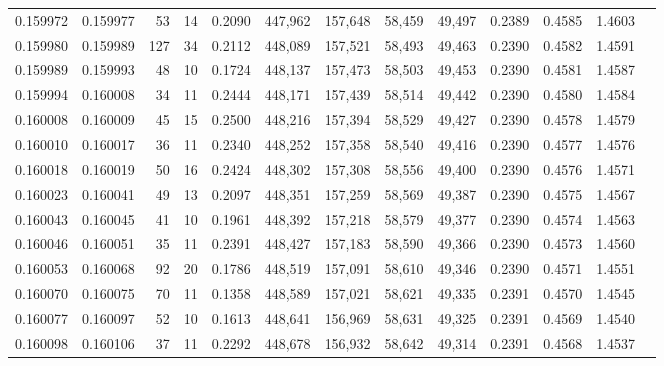 \begin{tabular}{rrrrrrrrrrrrr}
0.159972 & 0.159977 &    53 &  14 &                                     0.2090 & 447,962 & 157,648 &  58,459 &  49,497 & 0.2389 & 0.4585 & 1.4603 \\
0.159980 & 0.159989 &   127 &  34 &                                     0.2112 & 448,089 & 157,521 &  58,493 &  49,463 & 0.2390 & 0.4582 & 1.4591 \\
0.159989 & 0.159993 &    48 &  10 &                                     0.1724 & 448,137 & 157,473 &  58,503 &  49,453 & 0.2390 & 0.4581 & 1.4587 \\
0.159994 & 0.160008 &    34 &  11 &                                     0.2444 & 448,171 & 157,439 &  58,514 &  49,442 & 0.2390 & 0.4580 & 1.4584 \\
0.160008 & 0.160009 &    45 &  15 &                                     0.2500 & 448,216 & 157,394 &  58,529 &  49,427 & 0.2390 & 0.4578 & 1.4579 \\
0.160010 & 0.160017 &    36 &  11 &                                     0.2340 & 448,252 & 157,358 &  58,540 &  49,416 & 0.2390 & 0.4577 & 1.4576 \\
0.160018 & 0.160019 &    50 &  16 &                                     0.2424 & 448,302 & 157,308 &  58,556 &  49,400 & 0.2390 & 0.4576 & 1.4571 \\
0.160023 & 0.160041 &    49 &  13 &                                     0.2097 & 448,351 & 157,259 &  58,569 &  49,387 & 0.2390 & 0.4575 & 1.4567 \\
0.160043 & 0.160045 &    41 &  10 &                                     0.1961 & 448,392 & 157,218 &  58,579 &  49,377 & 0.2390 & 0.4574 & 1.4563 \\
0.160046 & 0.160051 &    35 &  11 &                                     0.2391 & 448,427 & 157,183 &  58,590 &  49,366 & 0.2390 & 0.4573 & 1.4560 \\
0.160053 & 0.160068 &    92 &  20 &                                     0.1786 & 448,519 & 157,091 &  58,610 &  49,346 & 0.2390 & 0.4571 & 1.4551 \\
0.160070 & 0.160075 &    70 &  11 &                                     0.1358 & 448,589 & 157,021 &  58,621 &  49,335 & 0.2391 & 0.4570 & 1.4545 \\
0.160077 & 0.160097 &    52 &  10 &                                     0.1613 & 448,641 & 156,969 &  58,631 &  49,325 & 0.2391 & 0.4569 & 1.4540 \\
0.160098 & 0.160106 &    37 &  11 &                                     0.2292 & 448,678 & 156,932 &  58,642 &  49,314 & 0.2391 & 0.4568 & 1.4537 \\

\end{tabular}
